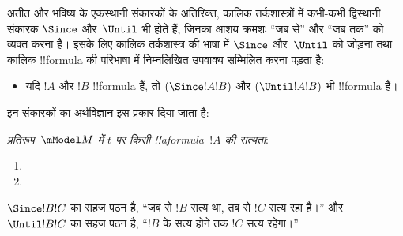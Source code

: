 \documentclass[../../../include/open-logic-section]{subfiles}
\begin{document}


अतीत और भविष्य के एकस्थानी संकारकों के अतिरिक्त, कालिक तर्कशास्त्रों में
कभी-कभी द्विस्थानी संकारक $\Since $ और~$\Until$ भी होते हैं, जिनका आशय
क्रमशः ``जब से'' और ``जब तक'' को व्यक्त करना है। इसके लिए कालिक तर्कशास्त्र
की भाषा में $\Since $ और~$\Until$ को जोड़ना तथा कालिक !!{formula} की परिभाषा
में निम्नलिखित उपवाक्य सम्मिलित करना पड़ता है:

\begin{itemize}
\item[] यदि $!A$ और $!B$ !!{formula} हैं, तो $(\Since  !A !B)$ और
  $(\Until !A !B)$ भी !!{formula} हैं।
\end{itemize}

इन संकारकों का अर्थविज्ञान इस प्रकार दिया जाता है:

\begin{defn}
  \emph{प्रतिरूप~$\mModel M$ में $t$ पर किसी !!a{formula}~$!A$ की सत्यता}:
  \begin{enumerate}
  \item{} 
   \item{} 
  \end{enumerate} 
\end{defn}

$\Since !B !C$ का सहज पठन है, ``जब से $!B$ सत्य था, तब से $!C$ सत्य रहा
है।'' और $\Until !B !C$ का सहज पठन है, ``$!B$ के सत्य होने तक $!C$ सत्य
रहेगा।''
\end{document}
